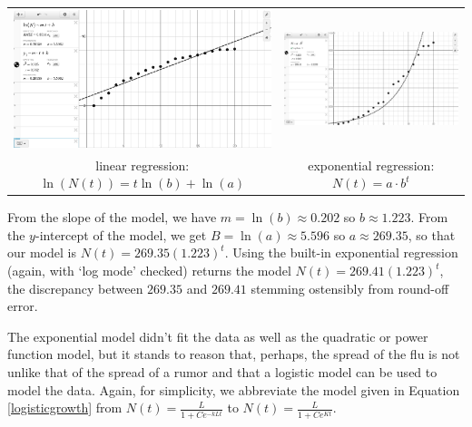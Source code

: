 \begin{center}

\begin{tabular}{cc}

\includegraphics[width=3in]{./ApplicationsofExponentialandLogarithmicFunctionsGraphics/ExpLogAppEx09.jpg} &

\includegraphics[width=3in]{./ApplicationsofExponentialandLogarithmicFunctionsGraphics/ExpLogAppEx07a.jpg} \\

linear regression: $\ln(N(t)) = t \ln(b) + \ln(a)$ &

exponential regression: $N(t) = a \cdot b^{t}$ \\

\end{tabular}

\end{center}

From the slope of the model, we have   $m = \ln(b) \approx 0.202$  so $b \approx 1.223$.  From the $y$-intercept of the model, we get $B = \ln(a) \approx  5.596$ so $a \approx 269.35$, so that our model is $N(t) = 269.35(1.223)^{t}$. Using the built-in exponential regression (again, with `log mode' checked) returns the model  $N(t) = 269.41 (1.223)^{t}$, the discrepancy between   $269.35$ and $269.41$ stemming ostensibly from round-off error.    

\smallskip

The exponential model didn't fit the data as well as the quadratic or power function model, but it stands to reason that, perhaps, the spread of the flu is not unlike that of the spread of a rumor and that a logistic model can be used to model the data.  Again, for simplicity, we abbreviate the model given in Equation \ref{logisticgrowth} from $N(t) =\frac{L}{1 + Ce^{-kLt}}$ to $N(t) = \frac{L}{1 + Ce^{Kt}}$.

